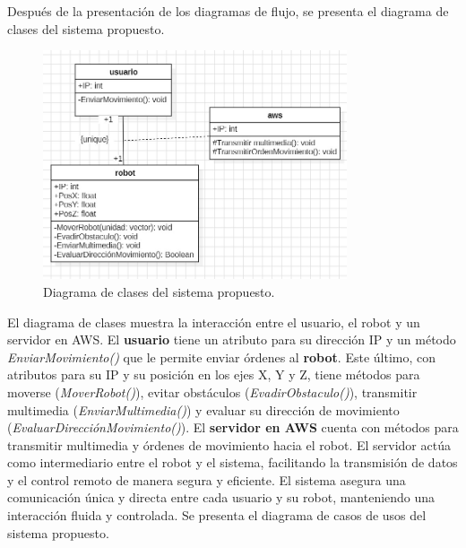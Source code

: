         \vskip 0.5cm
        \clearpage
        Despu\'es de la presentaci\'on de los diagramas de flujo, se presenta el diagrama de clases del sistema propuesto.
        \vskip 0.5cm
            \begin{figure}[htbp]
                \centering
                \includegraphics[width=0.8\textwidth]{images/desarrollo/diagramas/Clases.jpeg}
                \caption{Diagrama de clases del sistema propuesto.}
                \label{fig:Clases}
            \end{figure}
        \vskip 0.5cm
        El diagrama de clases muestra la interacci\'on entre el usuario, el robot y un servidor en AWS. 
        El \textbf{usuario} tiene un atributo para su direcci\'on IP y un m\'etodo \textit{EnviarMovimiento()} 
        que le permite enviar \'ordenes al \textbf{robot}. Este \'ultimo, con atributos para su IP y su posici\'on en los ejes X, Y 
        y Z, tiene m\'etodos para moverse (\textit{MoverRobot()}), evitar obst\'aculos (\textit{EvadirObstaculo()}), 
        transmitir multimedia (\textit{EnviarMultimedia()}) y evaluar su direcci\'on de movimiento (\textit{EvaluarDirecci\'onMovimiento()}).
        \vskip 0.5cm
        El \textbf{servidor en AWS} cuenta con m\'etodos para transmitir multimedia y \'ordenes de movimiento hacia el robot. 
        El servidor act\'ua como intermediario entre el robot y el sistema, facilitando la transmisi\'on de datos y el control 
        remoto de manera segura y eficiente. El sistema asegura una comunicaci\'on \'unica y directa entre cada usuario y su robot, 
        manteniendo una interacci\'on fluida y controlada.
        \vskip 0.5cm
        Se presenta el diagrama de casos de usos del sistema propuesto.
        \vskip 0.5cm
